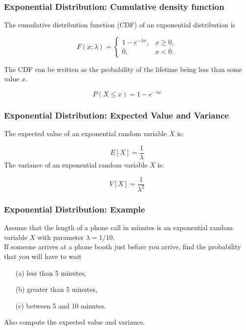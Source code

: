 \documentclass[IntroMain.tex]{subfiles}
\begin{document}
\begin{frame}[fragile]
\frametitle{Exponential Distribution: Cumulative density function}
\Large
\vspace{-1cm}
The cumulative distribution function (CDF) of an exponential distribution is

\[
F(x;\lambda) = \begin{cases}
1-e^{-\lambda x}, & x \ge 0, \\
0, & x < 0.
\end{cases}\]

The CDF can be written as the probability of the lifetime being less than some value $x$.

\[ P(X \leq x) = 1-e^{-\lambda x} \]

\end{frame}

\begin{frame}[fragile]
\frametitle{Exponential Distribution: Expected Value and Variance}
\Large
\vspace{-1.2cm}
The expected value of an exponential random variable $X$ is:

\[
E[X] = \frac{1}{\lambda}\]
The variance of an exponential random variable $X$ is:

\[
V[X] = \frac{1}{\lambda^2}\]

\end{frame}

\begin{frame}[fragile]
\frametitle{Exponential Distribution: Example}
\Large
\vspace{-1.2cm}
Assume that the length of a phone call in minutes is an exponential random variable $X$ with parameter
$\lambda = 1/10$. \\ 
\vspace{0.5cm}
If someone arrives at a phone booth just before you arrive, find the probability that you
will have to wait \begin{itemize}
\item[(a)] less than 5 minutes,
\item[(b)] greater than 5 minutes,
\item[(c)] between 5 and 10 minutes.
\end{itemize}
Also compute the expected value and variance.
\end{frame}
\end{document}
